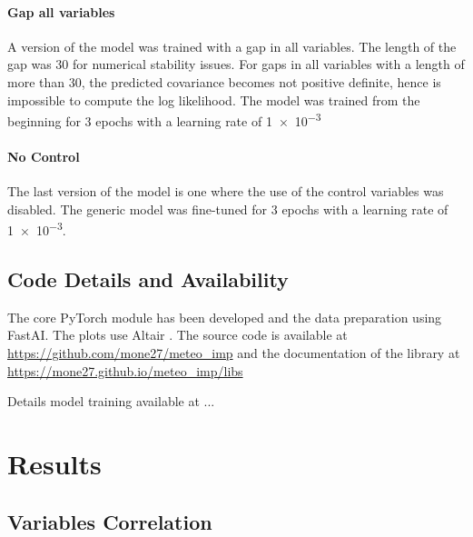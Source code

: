 \documentclass{article}
\let\Oldsection\section
\renewcommand{\section}{\FloatBarrier\Oldsection}
\let\Oldsubsection\subsection
\renewcommand{\subsection}{\FloatBarrier\Oldsubsection}
\begin{document}
\paragraph{Gap all variables} A version of the model was trained with a gap in all variables. The length of the gap was \num{30} for numerical stability issues. For gaps in all variables with a length of more than 30, the predicted covariance becomes not positive definite, hence is impossible to compute the log likelihood. The model was trained from the beginning for \num{3} epochs with a learning rate of \num{1e-3}

\paragraph{No Control} The last version of the model is one where the use of the control variables was disabled. The generic model was fine-tuned for \num{3} epochs with a learning rate of \num{1e-3}.

\subsection{Code Details and Availability}

The core PyTorch module has been developed and the data preparation using FastAI. The plots use Altair . The source code is available at \url{https://github.com/mone27/meteo_imp} and the documentation of the library at \url{https://mone27.github.io/meteo_imp/libs}

Details model training available at ...

\section{Results}

\subsection{Variables Correlation}
\end{document}
